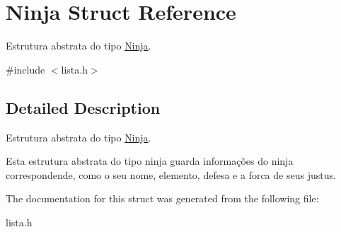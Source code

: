 \hypertarget{structNinja}{}\section{Ninja Struct Reference}
\label{structNinja}


Estrutura abstrata do tipo \mbox{\hyperlink{structNinja}{Ninja}}.  




{\ttfamily \#include $<$lista.\+h$>$}



\subsection{Detailed Description}
Estrutura abstrata do tipo \mbox{\hyperlink{structNinja}{Ninja}}. 

Esta estrutura abstrata do tipo ninja guarda informações do ninja correspondende, como o seu nome, elemento, defesa e a forca de seus justus. 

The documentation for this struct was generated from the following file\+:\begin{DoxyCompactItemize}
\item 
lista.\+h\end{DoxyCompactItemize}
